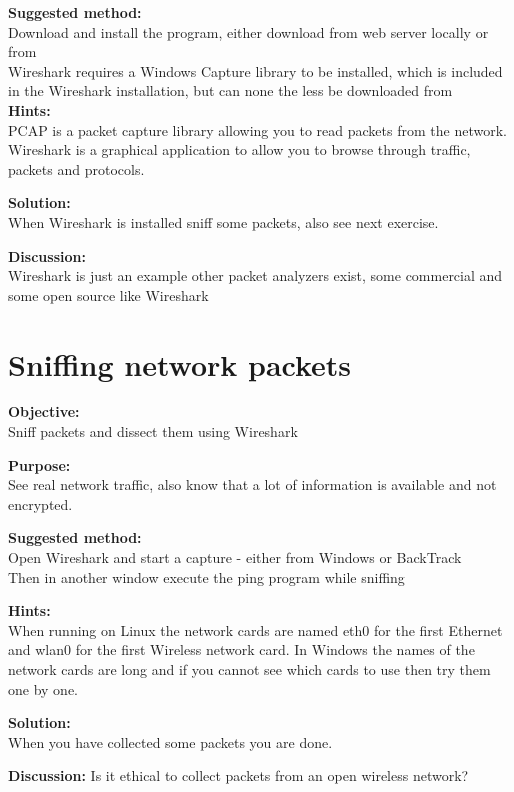 \documentclass[a4paper,11pt,notitlepage]{report}
\begin{document}
{\bf Suggested method:}\\
Download and install the program, either download from web server locally or from \\
Wireshark requires a Windows Capture library to be installed, which is included in the
Wireshark installation, but can none the less be downloaded from\\

{\bf Hints:}\\
PCAP is a packet capture library allowing you to read packets from the network. Wireshark is a graphical application to allow you to browse through traffic, packets and protocols.

{\bf Solution:}\\
When Wireshark is installed sniff some packets, also see next exercise.

{\bf Discussion:}\\
Wireshark is just an example other packet analyzers exist, some commercial and some open source like Wireshark

\chapter{Sniffing network packets}
\label{ex:wireshark-sniff}

{\bf Objective:}\\
Sniff packets and dissect them using Wireshark

{\bf Purpose:}\\
See real network traffic, also know that a lot of information is available and not encrypted.

{\bf Suggested method:}\\
Open Wireshark and start a capture - either from Windows or BackTrack\\
Then in another window execute the ping program while sniffing

{\bf Hints:}\\
When running on Linux the network cards are named eth0 for the first Ethernet and wlan0 for the first Wireless network card. In Windows the names of the network cards are long and if you cannot see which cards to use then try them one by one.

{\bf Solution:}\\
When you have collected some packets you are done.

{\bf Discussion:}
Is it ethical to collect packets from an open wireless network?
\end{document}
